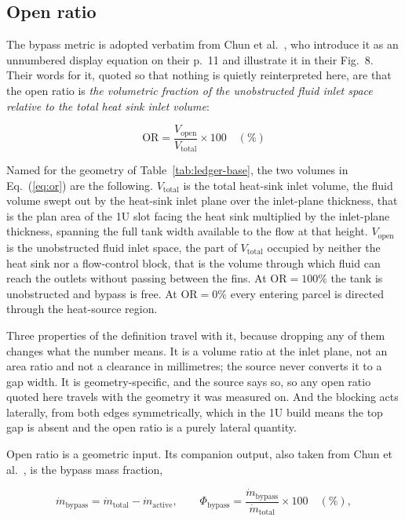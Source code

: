 \subsection{Open ratio}
\label{sec:openratio}

The bypass metric is adopted verbatim from Chun et al.~\cite{chun2026}, who introduce it as an
unnumbered display equation on their p.~11 and illustrate it in their Fig.~8. Their words for it,
quoted so that nothing is quietly reinterpreted here, are that the open ratio is
\textit{the volumetric fraction of the unobstructed fluid inlet space relative to the total heat
sink inlet volume}:

\begin{equation}
\mathrm{OR} = \frac{V_{\mathrm{open}}}{V_{\mathrm{total}}}\times 100 \quad (\%)
\label{eq:or}
\end{equation}

\noindent
Named for the geometry of Table~\ref{tab:ledger-base}, the two volumes in Eq.~(\ref{eq:or}) are
the following. $V_{\mathrm{total}}$ is the total heat-sink inlet volume, the fluid volume swept
out by the heat-sink inlet plane over the inlet-plane thickness, that is the plan area of the 1U
slot facing the heat sink multiplied by the inlet-plane thickness, spanning the full tank width
available to the flow at that height. $V_{\mathrm{open}}$ is the unobstructed fluid inlet space,
the part of $V_{\mathrm{total}}$ occupied by neither the heat sink nor a flow-control block, that
is the volume through which fluid can reach the outlets without passing between the fins. At
$\mathrm{OR}=100\%$ the tank is unobstructed and bypass is free. At $\mathrm{OR}=0\%$ every
entering parcel is directed through the heat-source region.

Three properties of the definition travel with it, because dropping any of them changes what the
number means. It is a volume ratio at the inlet plane, not an area ratio and not a clearance in
millimetres; the source never converts it to a gap width. It is geometry-specific, and the source
says so, so any open ratio quoted here travels with the geometry it was measured on. And the
blocking acts laterally, from both edges symmetrically, which in the 1U build means the top gap is
absent and the open ratio is a purely lateral quantity.

Open ratio is a geometric input. Its companion output, also taken from
Chun et al.~\cite{chun2026}, is the bypass mass fraction,

\begin{equation}
\dot{m}_{\mathrm{bypass}} = \dot{m}_{\mathrm{total}} - \dot{m}_{\mathrm{active}},
\qquad
\Phi_{\mathrm{bypass}} = \frac{\dot{m}_{\mathrm{bypass}}}{\dot{m}_{\mathrm{total}}}\times 100
\quad (\%),
\label{eq:phibypass}
\end{equation}

